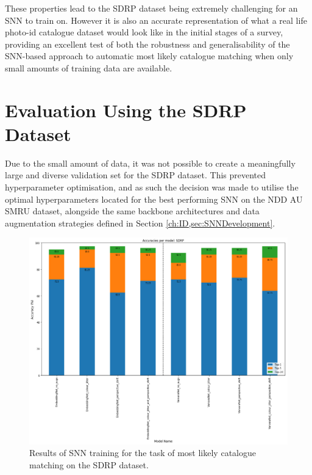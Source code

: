 These properties lead to the SDRP dataset being extremely challenging for an SNN to train on. However it is also an accurate representation of what a real life photo-id catalogue dataset would look like in the initial stages of a survey, providing an excellent test of both the robustness and generalisability of the SNN-based approach to automatic most likely catalogue matching when only small amounts of training data are available. 

\section{Evaluation Using the SDRP Dataset}\label{ch:SNNGeneralisation,sec:SNNEvalWithSDRP}

Due to the small amount of data, it was not possible to create a meaningfully large and diverse validation set for the SDRP dataset. This prevented hyperparameter optimisation, and as such the decision was made to utilise the optimal hyperparameters located for the best performing SNN on the NDD AU SMRU dataset, alongside the same backbone architectures and data augmentation strategies defined in Section \ref{ch:ID,sec:SNNDevelopment}.

\begin{figure}[h]
	\begin{center}
		\includegraphics[scale=0.4]{Chapter6/figs/SDRP-normal-split-model-comparison.png}
	\end{center}
	\caption{Results of SNN training for the task of most likely catalogue matching on the SDRP dataset.}
	\label{fig:SDRP-normal-split-model-comparison}
\end{figure}

